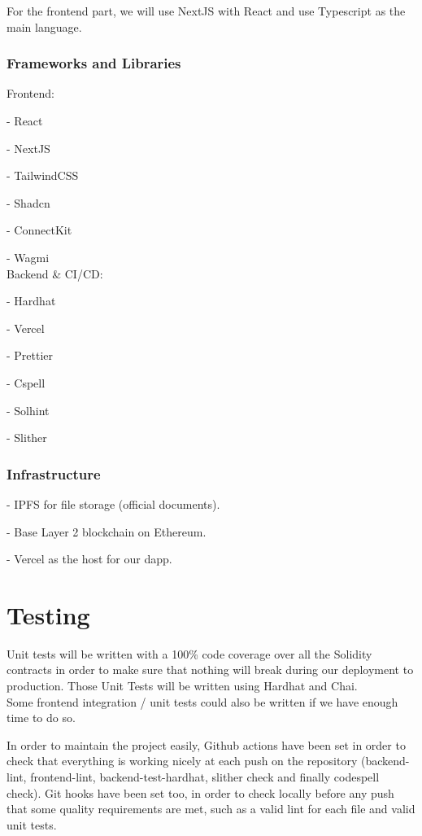 \documentclass[a4paper, 12pt]{article}
\begin{document}
For the frontend part, we will use NextJS with React and use Typescript as the main language.

\subsubsection{Frameworks and Libraries}

Frontend:

- React

- NextJS

- TailwindCSS

- Shadcn

- ConnectKit

- Wagmi\\

Backend \& CI/CD:

- Hardhat

- Vercel

- Prettier

- Cspell

- Solhint

- Slither


\subsubsection{Infrastructure}

- IPFS for file storage (official documents).

- Base Layer 2 blockchain on Ethereum.

- Vercel as the host for our dapp.


\section{Testing}

Unit tests will be written with a 100\% code coverage over all the Solidity contracts in order to make sure that nothing will break during our deployment to production. Those Unit Tests will be written using Hardhat and Chai.\\

Some frontend integration / unit tests could also be written if we have enough time to do so.

In order to maintain the project easily, Github actions have been set in order to check that everything is working nicely at each push on the repository (backend-lint, frontend-lint, backend-test-hardhat, slither check and finally codespell check). Git hooks have been set too, in order to check locally before any push that some quality requirements are met, such as a valid lint for each file and valid unit tests.
\end{document}
